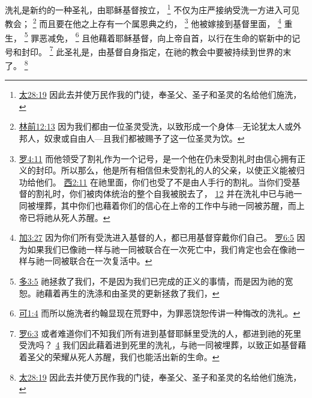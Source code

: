 \documentclass[12pt, a4paper, oneside]{ctexart}
\newcounter{parnum}[section]
\newcommand{\N}{%
   \noindent\refstepcounter{parnum}%
    \makebox[\parindent][l]{\textbf{\arabic{parnum}.}}}
\begin{document}
\N 洗礼是新约的一种圣礼，由耶稣基督按立，
	\footnote {
		\href{https://biblehub.com/matthew/28-19.htm}{太28:19} 因此去并使万民作我的门徒，奉圣父、圣子和圣灵的名给他们施洗，
	}
	不仅为庄严接纳受洗一方进入可见教会；
	\footnote {
		\href{https://biblehub.com/1_corinthians/12-13.htm}{林前12:13} 因为我们都由一位圣灵受洗，以致形成一个身体---无论犹太人或外邦人，奴隶或自由人---且我们都被赐予了这一位圣灵为饮。
	}
	而且要在他之上存有一个属恩典之约，
	\footnote {
		\href{https://biblehub.com/romans/4-11.htm}{罗4:11} 而他领受了割礼作为一个记号，是一个他在仍未受割礼时由信心拥有正义的封印。所以那么，他是所有相信但未受割礼的人的父亲，以使正义能被归功给他们。
		\href{https://biblehub.com/colossians/2-11.htm}{西2:11} 在祂里面，你们也受了不是由人手行的割礼。当你们受基督的割礼时，你们被肉体统治的整个自我被脱去了，
		\href{https://biblehub.com/colossians/2-12.htm}{12} 并在洗礼中已与祂一同被埋葬，其中你们也藉着你们的信心在上帝的工作中与祂一同被苏醒，而上帝已将祂从死人苏醒。
	}
	他被嫁接到基督里面，
	\footnote {
		\href{https://biblehub.com/galatians/3-27.htm}{加3:27} 因为你们所有受洗进入基督的人，都已用基督穿戴你们自己。
		\href{https://biblehub.com/romans/6-5.htm}{罗6:5} 因为如果我们已像祂一样与祂一同被联合在一次死亡中，我们肯定也会在像祂一样与祂一同被联合在一次复活中。
	}
	重生，
	\footnote {
		\href{https://biblehub.com/titus/3-5.htm}{多3:5} 祂拯救了我们，不是因为我们已完成的正义的事情，而是因为祂的宽恕。祂藉着再生的洗涤和由圣灵的更新拯救了我们，
	}
	罪恶减免，
	\footnote {
		\href{https://biblehub.com/mark/1-4.htm}{可1:4} 而所以施洗者约翰显现在荒野中，为罪恶饶恕传讲一种悔改的洗礼。
	}
	且他藉着耶稣基督，向上帝自首，以行在生命的崭新中的记号和封印。
	\footnote {
		\href{https://biblehub.com/romans/6-3.htm}{罗6:3} 或者难道你们不知我们所有进到基督耶稣里受洗的人，都进到祂的死里受洗吗？
		\href{https://biblehub.com/romans/6-4.htm}{4} 我们因此藉着进到死里的洗礼，与祂一同被埋葬，以致正如基督藉着圣父的荣耀从死人苏醒，我们也能活出新的生命。
	}
	此圣礼是，由基督自身指定，在祂的教会中要被持续到世界的末了。
	\footnote {
		\href{https://biblehub.com/matthew/28-19.htm}{太28:19} 因此去并使万民作我的门徒，奉圣父、圣子和圣灵的名给他们施洗，
	}
\end{document}
